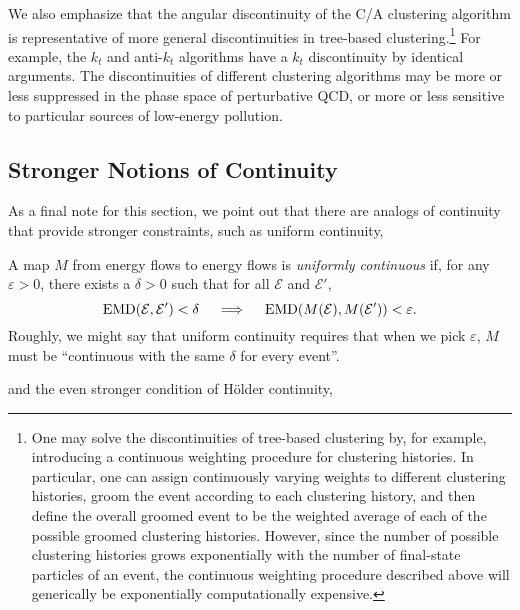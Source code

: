 We also emphasize that the angular discontinuity of the C/A clustering algorithm is representative of more general discontinuities in tree-based clustering.\footnote{
One may solve the discontinuities of tree-based clustering by, for example, introducing a continuous weighting procedure for clustering histories. In particular, one can assign continuously varying weights to different clustering histories, groom the event according to each clustering history, and then define the overall groomed event to be the weighted average of each of the possible groomed clustering histories.
%
However, since the number of possible clustering histories grows exponentially with the number of final-state particles of an event, the continuous weighting procedure described above will generically be exponentially computationally expensive.
}
%
For example, the \(k_t\) and anti-\(k_t\) algorithms have a \(k_t\) discontinuity by identical arguments.
%
The discontinuities of different clustering algorithms may be more or less suppressed in the phase space of perturbative QCD, or more or less sensitive to particular sources of low-energy pollution.


\subsection{Stronger Notions of Continuity}
As a final note for this section, we point out that there are analogs of continuity that provide stronger constraints, such as uniform continuity,

\begin{definition}\label{def:eventuniformcontinuity}
A map \(M\) from energy flows to energy flows is \textit{uniformly continuous} if, for any \(\varepsilon > 0\), there exists a \(\delta > 0\) such that for all \(\mathcal{E}\) and \(\mathcal E'\),
%
\begin{equation*}\label{eqn:emduniformcontinuity}
    {\rm EMD}(\mathcal E,\mathcal E')<\delta
    \quad\implies\quad
    {\rm EMD}(M(\mathcal E), M(\mathcal E')) < \varepsilon.
\end{equation*}
%
Roughly, we might say that uniform continuity requires that when we pick \(\varepsilon\), \(M\) must be ``continuous with the same \(\delta\) for every event''.
\end{definition}

\noindent
and the even stronger condition of H\"older continuity,

